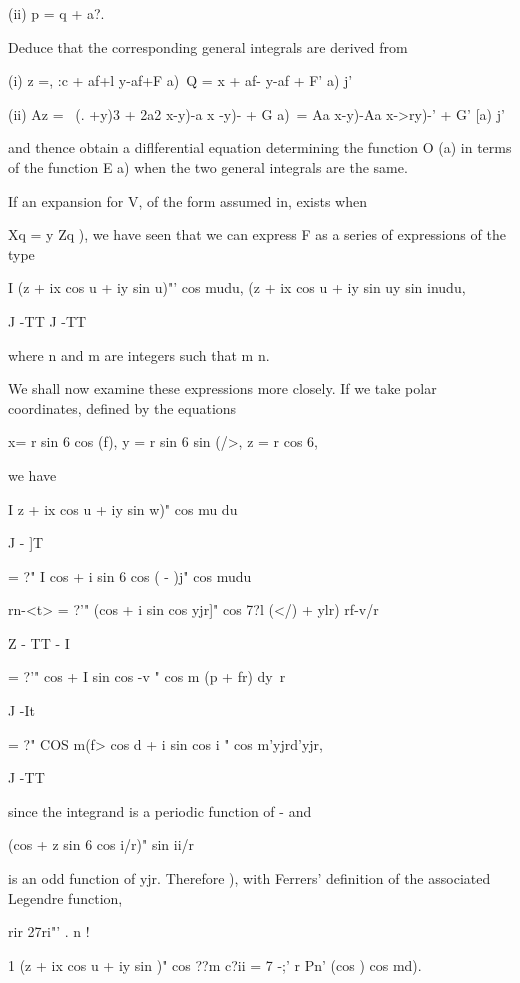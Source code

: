 (ii) p = q + a?.

Deduce that the corresponding general integrals are derived from

(i) z =, :c + af+l y-af+F a)\ Q = x + af- y-af + F' a) j'

(ii) Az = \ (. +y)3 + 2a2 x-y)-a x -y)- + G a)\ = Aa x-y)-Aa x->ry)-'
+ G' [a) j'

and thence obtain a diflferential equation determining the function O
(a) in terms of the function E a) when the two general integrals are
the same.

If an expansion for V, of the form assumed in, exists when

Xq = y Zq ), we have seen that we can express F as a series of
expressions of the type

I (z + ix cos u + iy sin u)"' cos mudu, (z + ix cos u + iy sin uy sin
inudu,

J -TT J -TT

where n and m are integers such that m n.

We shall now examine these expressions more closely. If we take polar
coordinates, defined by the equations

x= r sin 6 cos (f), y = r sin 6 sin (/>, z = r cos 6,

%
%

we have

I z + ix cos u + iy sin w)" cos mu du

J - ]T

= ?" I cos + i sin 6 cos ( - )j" cos mudu

rn-<t> = ?'" (cos + i sin cos yjr]" cos 7?l (</) + ylr) rf-v/r

Z - TT - I

= ?'" cos + I sin cos -v " cos m (p + fr) dy\ r

J -It

= ?" COS m(f> cos d + i sin cos i " cos m'yjrd'yjr,

J -TT

since the integrand is a periodic function of - and

(cos + z sin 6 cos i/r)" sin ii/r

is an odd function of yjr. Therefore ), with Ferrers'
definition of the associated Legendre function,

rir 27ri"' . n !

1 (z + ix cos u + iy sin )" cos ??m c?ii = 7 -;' r Pn' (cos ) cos md).

